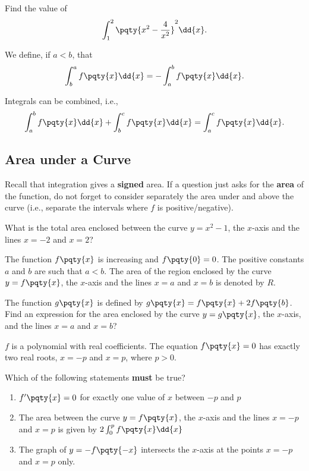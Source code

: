\documentclass{article}
\begin{document}
\begin{example}[TMUA 2016 P2 Q1]
    Find the value of
    \[
        \int_{1}^{2} \pqty{x^2 - \frac{4}{x^2}}^2 \dd{x}.
    \]
\end{example}

We define, if \(a < b\), that
\[
    \int_{b}^{a} f\pqty{x} \dd{x} = - \int_{a}^{b} f\pqty{x} \dd{x}.
\]

Integrals can be combined, i.e.,
\[
    \int_{a}^{b} f\pqty{x} \dd{x} + \int_{b}^{c} f\pqty{x} \dd{x} = \int_{a}^{c} f\pqty{x} \dd{x}.
\]

\subsection{Area under a Curve}

Recall that integration gives a \textbf{signed} area. If a question just asks for the \textbf{area} of the function, do not forget to consider separately the area under and above the curve (i.e., separate the intervals where \(f\) is positive/negative).

\begin{example}[TMUA 2016 P1 Q5]
    What is the total area enclosed between the curve \(y = x^2 - 1\), the \(x\)-axis and the lines \(x = -2\) and \(x = 2\)?
\end{example}

\begin{example}[TMUA 2017 P2 Q11]
    The function \(f\pqty{x}\) is increasing and \(f\pqty{0} = 0\). The positive constants \(a\) and \(b\) are such that \(a < b\). The area of the region enclosed by the curve \(y = f\pqty{x}\), the \(x\)-axis and the lines \(x = a\) and \(x = b\) is denoted by \(R\).

    The function \(g\pqty{x}\) is defined by \(g\pqty{x} = f\pqty{x} + 2 f\pqty{b}\). Find an expression for the area enclosed by the curve \(y = g\pqty{x}\), the \(x\)-axis, and the lines \(x = a\) and \(x = b\)?
\end{example}

\begin{example}[TMUA 2016 P2 Q11]
    \(f\) is a polynomial with real coefficients. The equation \(f\pqty{x} = 0\) has exactly two real roots, \(x = -p\) and \(x = p\), where \(p > 0\).

    Which of the following statements \textbf{must} be true?

    \begin{enumerate}[label=\Roman*.]
        \item \(f'\pqty{x} = 0\) for exactly one value of \(x\) between \(-p\) and \(p\)
        \item The area between the curve \(y = f\pqty{x}\), the \(x\)-axis and the lines \(x = -p\) and \(x = p\) is given by \(2 \int_{0}^{p} f\pqty{x} \dd{x}\)
        \item The graph of \(y = - f\pqty{-x}\) intersects the \(x\)-axis at the points \(x = -p\) and \(x = p\) only.
    \end{enumerate}
\end{example}
\end{document}
